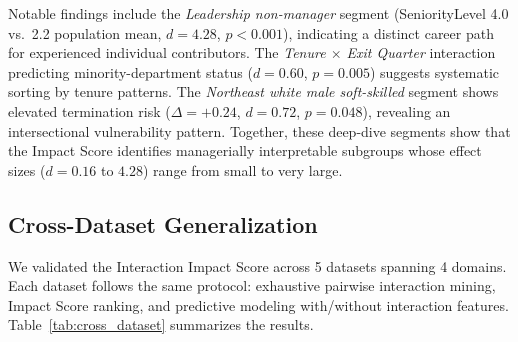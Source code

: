 \documentclass[conference]{IEEEtran}
\begin{document}
Notable findings include the \textit{Leadership non-manager} segment (SeniorityLevel 4.0 vs.~2.2 population mean, $d = 4.28$, $p < 0.001$), indicating a distinct career path for experienced individual contributors. The \textit{Tenure $\times$ Exit Quarter} interaction predicting minority-department status ($d = 0.60$, $p = 0.005$) suggests systematic sorting by tenure patterns. The \textit{Northeast white male soft-skilled} segment shows elevated termination risk ($\Delta = +0.24$, $d = 0.72$, $p = 0.048$), revealing an intersectional vulnerability pattern. Together, these deep-dive segments show that the Impact Score identifies managerially interpretable subgroups whose effect sizes ($d = 0.16$ to $4.28$) range from small to very large.

\subsection{Cross-Dataset Generalization}

We validated the Interaction Impact Score across 5 datasets spanning 4 domains. Each dataset follows the same protocol: exhaustive pairwise interaction mining, Impact Score ranking, and predictive modeling with/without interaction features. Table~\ref{tab:cross_dataset} summarizes the results.

\begin{table}[htb]
\centering
\footnotesize
\renewcommand{\arraystretch}{1.15}
\caption{Cross-dataset consistency: Impact Score rankings and predictive model improvement across 5 datasets spanning 4 domains.}
\label{tab:cross_dataset}
\end{table}
\end{document}
